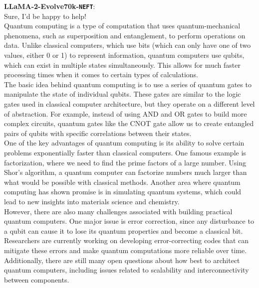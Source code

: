 \documentclass{article} %
\newcommand{\neft}{\texttt{NEFT}}
\newcommand{\llama}{LLaMA}
\begin{document}
\begin{tcolorbox}[breakable,boxrule=0pt]
  \textbf{\llama{}-2-Evolve70k-\neft{}}:\\ Sure, I'd be happy to help! \\Quantum computing is a type of computation that uses quantum-mechanical phenomena, such as superposition and entanglement, to perform operations on data. Unlike classical computers, which use bits (which can only have one of two values, either 0 or 1) to represent information, quantum computers use qubits, which can exist in multiple states simultaneously. This allows for much faster processing times when it comes to certain types of calculations.\\The basic idea behind quantum computing is to use a series of quantum gates to manipulate the state of individual qubits. These gates are similar to the logic gates used in classical computer architecture, but they operate on a different level of abstraction. For example, instead of using AND and OR gates to build more complex circuits, quantum gates like the CNOT gate allow us to create entangled pairs of qubits with specific correlations between their states.\\One of the key advantages of quantum computing is its ability to solve certain problems exponentially faster than classical computers. One famous example is factorization, where we need to find the prime factors of a large number. Using Shor's algorithm, a quantum computer can factorize numbers much larger than what would be possible with classical methods. Another area where quantum computing has shown promise is in simulating quantum systems, which could lead to new insights into materials science and chemistry.\\However, there are also many challenges associated with building practical quantum computers. One major issue is error correction, since any disturbance to a qubit can cause it to lose its quantum properties and become a classical bit. Researchers are currently working on developing error-correcting codes that can mitigate these errors and make quantum computations more reliable over time. Additionally, there are still many open questions about how best to architect quantum computers, including issues related to scalability and interconnectivity between components.\\

\end{tcolorbox}
\end{document}
